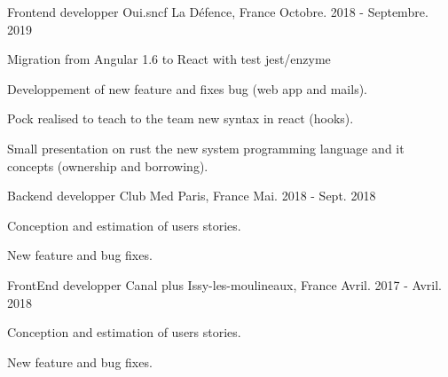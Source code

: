 

\begin{cventries}

  \cventry
    {Frontend developper} %
    {Oui.sncf} %
    {La Défence, France} %
    {Octobre. 2018 - Septembre. 2019} %
    {
      \begin{cvitems} %
        \item {Migration from  Angular 1.6 to React with test jest/enzyme}
        \item {Developpement of new feature and fixes  bug (web app and mails).}
        \item {Pock realised to teach to the team new syntax in react (hooks).}
        \item {Small presentation on rust the new system programming language and it concepts (ownership and borrowing).}
      \end{cvitems}
    }
\cventry
  {Backend developper} %
  {Club Med} %
  {Paris, France} %
  {Mai. 2018 - Sept. 2018} %
  {
    \begin{cvitems} %
      \item {Conception and estimation of users stories.}
      \item {New feature and bug fixes.}
    \end{cvitems}
  }

  \cventry
    {FrontEnd developper} %
    {Canal plus} %
    {Issy-les-moulineaux, France} %
    {Avril. 2017 - Avril. 2018} %
    {
      \begin{cvitems} %
        \item {Conception and estimation of users stories.}
        \item {New feature and bug fixes.}
      \end{cvitems}
    }


\end{cventries}
